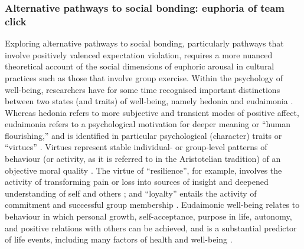 


\subsubsection{Alternative pathways to social bonding: euphoria of team click}
Exploring alternative pathways to social bonding, particularly pathways that involve positively valenced expectation violation, requires a more nuanced theoretical account of the social dimensions of euphoric arousal in cultural practices such as those that involve group exercise.  Within the psychology of well-being, researchers have for some time recognised important distinctions between two states (and traits) of well-being, namely hedonia and eudaimonia \citep{Ryff1989}.  Whereas hedonia refers to more subjective and transient modes of positive affect, eudaimonia refers to a psychological motivation for deeper meaning or ``human flourishing,'' and is identified in particular psychological (character) traits or ``virtues'' \citep{Baumeister2013}.  Virtues represent stable individual- or group-level patterns of behaviour (or activity, as it is referred to in the Aristotelian tradition) of an objective moral quality \citep{Fowers2015}.
The virtue of ``resilience'', for example, involves the activity of transforming pain or loss into sources of insight and deepened understanding of self and others \citep{Ryff2015}; and ``loyalty'' entails the activity of commitment and successful group membership \citep{Fowers2015}.
Eudaimonic well-being relates to behaviour in which personal growth, self-acceptance, purpose in life, autonomy, and positive relations with others can be achieved, and is a substantial predictor of life events, including many factors of health and well-being \citep{Ryff2004,Urry2004}.

